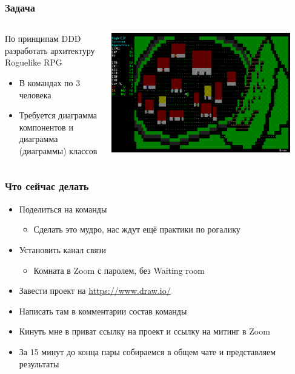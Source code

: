 \documentclass[xetex,mathserif,serif]{beamer}
\begin{document}
	\begin{frame}
		\frametitle{Задача}
		\begin{columns}
			\begin{column}{0.5\textwidth}
				По принципам DDD разработать архитектуру Roguelike RPG

				\begin{itemize}
					\item В командах по 3 человека
					\item Требуется диаграмма компонентов и диаграмма (диаграммы) классов
				\end{itemize}
			\end{column}
			\begin{column}{0.5\textwidth}
				\begin{center}
					\includegraphics[width=0.9\textwidth]{roguelike.png}
				\end{center}
			\end{column}
		\end{columns}
	\end{frame}

	\begin{frame}
		\frametitle{Что сейчас делать}
		\begin{itemize}
			\item Поделиться на команды
			\begin{itemize}
				\item Сделать это мудро, нас ждут ещё практики по рогалику
			\end{itemize}
			\item Установить канал связи
			\begin{itemize}
				\item Комната в Zoom с паролем, без Waiting room
			\end{itemize}
			\item Завести проект на \url{https://www.draw.io/}
			\item Написать там в комментарии состав команды
			\item Кинуть мне в приват ссылку на проект и ссылку на митинг в Zoom
			\item За 15 минут до конца пары собираемся в общем чате и представляем результаты
		\end{itemize}
	\end{frame}
\end{document}
